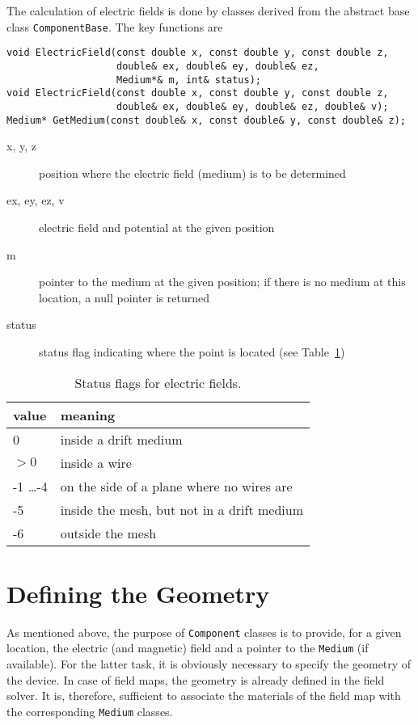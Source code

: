 The calculation of electric fields is done by classes 
derived from the abstract base class \texttt{ComponentBase}. 
The key functions are 
\begin{lstlisting}
void ElectricField(const double x, const double y, const double z,
                   double& ex, double& ey, double& ez,
                   Medium*& m, int& status);
void ElectricField(const double x, const double y, const double z,
                   double& ex, double& ey, double& ez, double& v);
Medium* GetMedium(const double& x, const double& y, const double& z);
\end{lstlisting}
\begin{description}
  \item[x, y, z] 
  position where the electric field (medium) is to be determined
  \item[ex, ey, ez, v] 
  electric field and potential at the given position
  \item[m] pointer to the medium at the given position; 
  if there is no medium at this location, a null pointer is returned
  \item[status] status flag indicating where the point is located
  (see Table~\ref{Tab:StatusFlagsField})
\end{description}

\begin{table} 
  \centering
  \begin{tabular}{l l}
  \toprule
  value & meaning \\
  \midrule
    0   & inside a drift medium \\
  \(> 0\) & inside a wire \\
   -1 \dots -4  &  on the side of a plane where no wires are \\
   -5   & inside the mesh, but not in a drift medium \\
   -6   & outside the mesh \\
  \bottomrule
  \end{tabular}
  \caption{Status flags for electric fields.}
  \label{Tab:StatusFlagsField}
\end{table}

\section{Defining the Geometry}

As mentioned above, the purpose of \texttt{Component} classes is to 
provide, for a given location, the electric (and magnetic) field and a pointer to the 
\texttt{Medium} (if available).
For the latter task, it is obviously necessary to specify the geometry 
of the device. 
In case of field maps, the geometry is already defined in the field solver. 
It is, therefore, sufficient to associate the materials 
of the field map with the corresponding \texttt{Medium} classes. 

